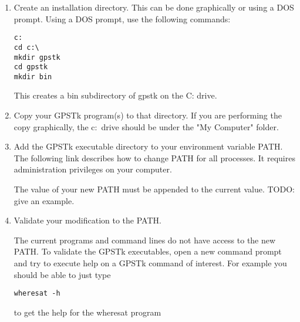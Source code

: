 \begin{enumerate}

\item Create an installation directory. This can be done graphically or using a DOS prompt. Using a DOS prompt, use the following commands:

\begin{verbatim}
c:
cd c:\
mkdir gpstk
cd gpstk
mkdir bin
\end{verbatim}

This creates a bin subdirectory of gpstk on the C: drive.

\item Copy your GPSTk program(s) to that directory. If you are performing the copy graphically, the c:\ drive should be under the "My Computer" folder.

\item Add the GPSTk executable directory to your environment variable PATH. The following link describes how to change PATH for all processes. It requires administration privileges on your computer.

The value of your new PATH must be appended to the current value. TODO: give an example.

\item Validate your modification to the PATH.

The current programs and command lines do not have access to the new PATH. To validate the GPSTk executables, open a new command prompt and try to execute help on a GPSTk command of interest. For example you should be able to just type

\begin{verbatim}
wheresat -h
\end{verbatim}

to get the help for the wheresat program
\end{enumerate}